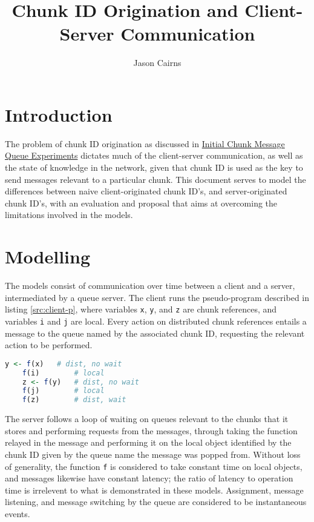 \documentclass[a4paper,10pt]{article}
\begin{document}
\title{Chunk ID Origination and Client-Server Communication}
\author{Jason Cairns}
  
\maketitle{}

\section{Introduction}

The problem of chunk ID origination as discussed in
\href{init-chunk-msg-q-exp.pdf}{Initial Chunk Message Queue Experiments}
dictates much of the client-server communication, as well as the state of
knowledge in the network, given that chunk ID is used as the key to send
messages relevant to a particular chunk.
This document serves to model the differences between naive client-originated
chunk ID's, and server-originated chunk ID's, with an evaluation and proposal
that aims at overcoming the limitations involved in the models.

\section{Modelling}\label{sec:cid-model}

The models consist of communication over time between a client and a server,
intermediated by a queue server.
The client runs the pseudo-program described in listing \ref{src:client-p},
where variables \texttt{x}, \texttt{y}, and \texttt{z} are chunk references,
and variables \texttt{i} and \texttt{j} are local. 
Every action on distributed chunk references entails a message to the queue
named by the associated chunk ID, requesting the relevant action to be
performed.

\begin{lstlisting}[language=R, float, 
caption={Modelled Client Program}, label=src:client-p]
	y <- f(x)	# dist, no wait
	f(i)		# local
	z <- f(y)	# dist, no wait
	f(j)		# local
	f(z)		# dist, wait
\end{lstlisting}

The server follows a loop of waiting on queues relevant to the chunks that it
stores and performing requests from the messages, through taking the function
relayed in the message and performing it on the local object identified by the
chunk ID given by the queue name the message was popped from.
Without loss of generality, the function \texttt{f} is considered to take
constant time on local objects, and messages likewise have constant latency;
the ratio of latency to operation time is irrelevent to what is demonstrated in
these models.
Assignment, message listening, and message switching by the queue are
considered to be instantaneous events.
\end{document}
